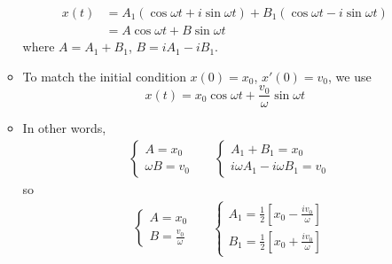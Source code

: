 \documentclass[../notes.tex]{subfiles}
\begin{document}
\begin{itemize}
\begin{itemize}
\begin{align*}
            x(t) &= A_1(\cos\omega t+i\sin\omega t)+B_1(\cos\omega t-i\sin\omega t)\\
            &= A\cos\omega t+B\sin\omega t
        \end{align*}
        where $A=A_1+B_1$, $B=iA_1-iB_1$.
        \item To match the initial condition $x(0)=x_0$, $x'(0)=v_0$, we use
        \begin{equation*}
            x(t) = x_0\cos\omega t+\frac{v_0}{\omega}\sin\omega t
        \end{equation*}
        \item In other words,
        \begin{align*}
            &
            \begin{cases}
                A=x_0\\
                \omega B=v_0
            \end{cases}
            &&
            \begin{cases}
                A_1+B_1=x_0\\
                i\omega A_1-i\omega B_1=v_0
            \end{cases}
        \end{align*}
        so
        \begin{align*}
            &
            \begin{cases}
                A=x_0\\
                B=\frac{v_0}{\omega}
            \end{cases}
            &&
            \begin{cases}
                A_1=\frac{1}{2}\left[ x_0-\frac{iv_0}{\omega} \right]\\
                B_1=\frac{1}{2}\left[ x_0+\frac{iv_0}{\omega} \right]
            \end{cases}
        \end{align*}
    \end{itemize}
\end{itemize}
\end{document}
